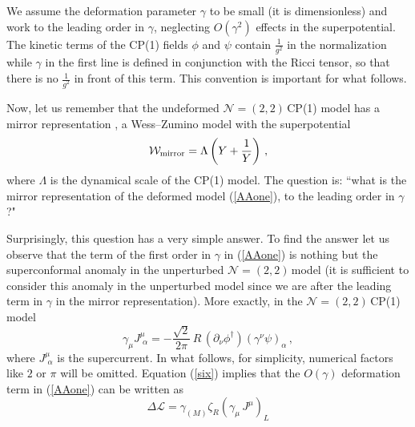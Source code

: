 \documentclass[epsfig,12pt]{article}
\def\beq{\begin{equation}}
\def\eeq{\end{equation}}
\def\beqn{\begin{eqnarray}}
\def\eeqn{\end{eqnarray}}
\newcommand{\ntt}{${\mathcal N}=(2,2)\,$}
\def\beqn{\begin{eqnarray}}
\def\eeqn{\end{eqnarray}}
\def\beq{\begin{equation}}
\def\eeq{\end{equation}}
\newcommand{\ssm}{{\scriptscriptstyle(M)}}
\begin{document}
{We assume the deformation parameter $\gamma$ to be small (it is dimensionless)
and work to the leading order in $\gamma$, neglecting $O(\gamma^2)$ effects in the superpotential.
The kinetic terms of the CP(1) fields $\phi$ and $\psi$ contain $\frac{1}{g^2}$ in the normalization
while $\gamma$ in the first line is defined in conjunction with the Ricci tensor, so that there is no $\frac{1}{g^2}$
in front of this term. This convention is important for what follows.

Now, let us remember that the undeformed \ntt  CP(1) model has a mirror representation \cite{MR1,MR2},
a Wess--Zumino model with the superpotential
\beq
{\mathcal W}_{\rm mirror} = \Lambda \left( Y + \frac{1}{Y}\right)\,,
\label{AABone}
\eeq
where $\Lambda$ is the dynamical scale of the CP(1) model.
The question is: ``what is the mirror representation of the deformed model (\ref{AAone}), to the leading order in $\gamma$?"

Surprisingly, this question has a very simple answer.
To find the answer let us observe that the term of the first order in $\gamma$ in (\ref{AAone})
is nothing but the superconformal anomaly in the unperturbed \ntt  model (it is sufficient to consider this anomaly in the unperturbed model since we are after the leading term in $\gamma$ in the mirror representation).
More exactly, in the
\ntt  CP(1) model \cite{ls,ls1}
\beq
\gamma_\mu J^\mu_{\,\,\alpha} = -\frac{ \sqrt 2}{2\pi}\,R\, \left(\partial_\nu \phi^\dagger\right)\left(
\gamma^\nu\psi\right)_\alpha\,,
\label{six}
\eeq
where $J^\mu_{\,\,\alpha}$ is the supercurrent.
In what follows, for simplicity,  numerical factors like $2$ or $\pi$ will be omitted. Equation (\ref{six})
implies that the $O(\gamma )$ deformation term in (\ref{AAone}) can be written as
\beq
\Delta {\mathcal L} = \gamma_\ssm \zeta_R\left(\gamma_\mu \, J^\mu\right)_L
\label{seven}
\eeq 

}
\end{document}
